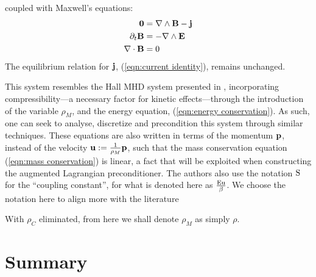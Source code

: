     coupled with Maxwell's equations:
    \begin{align}
        \mathbf{0}  &=  \nabla\wedge\mathbf{B} - \mathbf{j}  \label{eqn:Ampère's law}  \\
        \partial_{t}\mathbf{B}  &=  - \nabla\wedge\mathbf{E}  \label{eqn:Faraday's law}  \\
        \nabla\cdot\mathbf{B}  &=  0  \label{eqn:Gauss's law}
    \end{align}
    The equilibrium relation for $\mathbf{j}$, (\ref{eqn:current identity}), remains unchanged.

    This system resembles the Hall MHD system presented in \BA{[LHF22]}, incorporating compressibility—a necessary factor for kinetic effects—through the introduction of the variable $\rho_{M}$, and the energy equation, (\ref{eqn:energy conservation}). As such, one can seek to analyse, discretize and precondition this system through similar techniques. These equations are also written in terms of the momentum $\mathbf{p}$, instead of the velocity $\mathbf{u}  :=  \frac{1}{\rho_{M}}\mathbf{p}$, such that the mass conservation equation (\ref{eqn:mass conservation}) is linear, a fact that will be exploited when constructing the augmented Lagrangian preconditioner. The authors also use the notation $\mathrm{S}$ for the ``coupling constant'', for what is denoted here as $\frac{\mathrm{Eu}}{\beta}$. We choose the notation here to align more with the literature

    With $\rho_{C}$ eliminated, from here we shall denote $\rho_{M}$ as simply $\rho$.
    

    
    
    

    
    \section*{Summary}
    